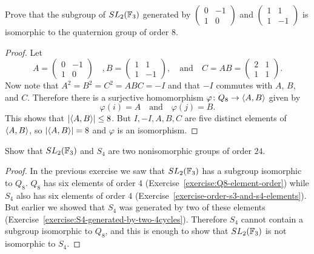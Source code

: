  Prove that the subgroup of $SL_2(\mathbb{F}_3)$ generated by
$\begin{pmatrix} 0 & -1 \\ 1 & 0 \end{pmatrix}$ and
$\begin{pmatrix} 1 & 1 \\ 1 & -1 \end{pmatrix}$ is isomorphic to the
quaternion group of order $8$.
\begin{proof}
  Let
  \begin{equation*}
    A = \begin{pmatrix} 0 & -1 \\ 1 & 0 \end{pmatrix}
    \quad,
    B = \begin{pmatrix} 1 & 1 \\ 1 & -1 \end{pmatrix},
    \quad\text{and}\quad
    C = AB = \begin{pmatrix} 2 & 1 \\ 1 & 1 \end{pmatrix}.
  \end{equation*}
  Now note that $A^2 = B^2 = C^2 = ABC = -I$ and that $-I$ commutes
  with $A$, $B$, and $C$. Therefore there is a surjective homomorphism
  $\varphi\colon Q_8\to\langle{A,B}\rangle$ given by
  \begin{equation*}
    \varphi(i) = A \quad\text{and}\quad \varphi(j) = B.
  \end{equation*}
  This shows that $\lvert{\langle{A,B}\rangle}\rvert\leq8$. But $I, -I, A, B, C$ are
  five distinct elements of $\langle{A,B}\rangle$, so $\lvert{\langle{A,B}\rangle}\rvert = 8$ and
  $\varphi$ is an isomorphism.
\end{proof}

 Show that $SL_2(\mathbb{F}_3)$ and $S_4$ are two nonisomorphic
groups of order $24$.
\begin{proof}
  In the previous exercise we saw that $SL_2(\mathbb{F}_3)$ has a subgroup
  isomorphic to $Q_8$. $Q_8$ has six elements of order $4$
  (Exercise~\ref{exercise:Q8-element-order}) while $S_4$ also has six
  elements of order $4$
  (Exercise~\ref{exercise-order-s3-and-s4-elements}). But earlier we
  showed that $S_4$ was generated by two of these elements
  (Exercise~\ref{exercise:S4-generated-by-two-4cycles}). Therefore
  $S_4$ cannot contain a subgroup isomorphic to $Q_8$, and this is
  enough to show that $SL_2(\mathbb{F}_3)$ is not isomorphic to $S_4$.
\end{proof}
